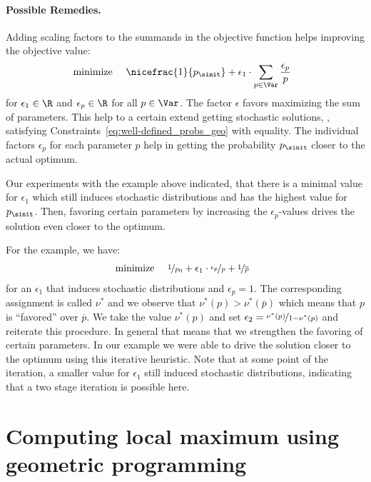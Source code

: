 
\paragraph{Possible Remedies.}
Adding scaling factors to the summands in the objective function helps improving the objective value:
\begin{align}
			\text{ minimize } &\quad \nicefrac{1}{p_{\sinit}} + \epsilon_1\cdot\sum_{p\in\Var}\frac{\epsilon_p}{p}\label{eq:min_geo_relax1}
\end{align}
for $\epsilon_1\in\R$ and $\epsilon_p\in\R$ for all $p\in\Var$. The factor $\epsilon$ favors maximizing the sum of parameters. This help to a certain extend getting stochastic solutions, \ie, satisfying Constraints~\ref{eq:well-defined_probs_geo} with equality. The individual factors $\epsilon_p$ for each parameter $p$ help in getting the probability $p_{\sinit}$ closer to the actual optimum.

Our experiments with the example above indicated, that there is a minimal value for $\epsilon_1$ which still induces stochastic distributions and has the highest value for $p_{\sinit}$. Then, favoring certain parameters by increasing the $\epsilon_p$-values drives the solution even closer to the optimum. 

For the example, we have:
\begin{align}
			\text{ minimize } &\quad \nicefrac{1}{p_{0}} + \epsilon_1\cdot \nicefrac{\epsilon_p}{p} + \nicefrac{1}{\overline p}
\end{align}
for an $\epsilon_1$ that induces stochastic distributions and $\epsilon_p=1$. The corresponding assignment is called $\nu^*$ and we observe that $\nu^*(p)>\nu^*(\overline p)$ which means that $p$ is ``favored'' over $\overline p$. We take the value $\nu^*(p)$ and set $\epsilon_2=\nicefrac{\nu^*(p)}{1-\nu^*(p)}$ and reiterate this procedure. In general that means that we strengthen the favoring of certain parameters. In our example we were able to drive the solution closer to the optimum using this iterative heuristic. Note that at some point of the iteration, a smaller value for $\epsilon_1$ still induced stochastic distributions, indicating that a two stage iteration is possible here.

\section{Computing local maximum using geometric programming}

